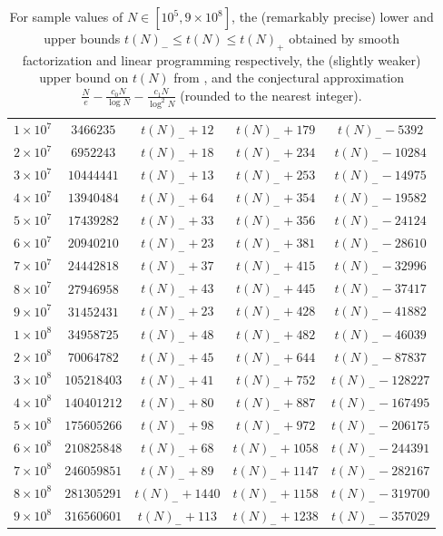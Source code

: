\documentclass[12pt,a4paper,reqno]{amsart}
\numberwithin{equation}{section}
\theoremstyle{plain}
\theoremstyle{definition}
\begin{document}
\begin{table}[ht]
\begin{tabular}{|c|c|c|c|c|}
\hline
$1 \times 10^7$ & $\num{3466235}$ & $t(N)_- + 12$ & $t(N)_- + 179$ & $t(N)_- - \num{5392}$ \\
$2 \times 10^7$ & $\num{6952243}$ & $t(N)_- + 18$ & $t(N)_- + 234$ & $t(N)_- - \num{10284}$ \\
$3 \times 10^7$ & $\num{10444441}$ & $t(N)_- + 13$ & $t(N)_- + 253$ & $t(N)_- - \num{14975}$ \\
$4 \times 10^7$ & $\num{13940484}$ & $t(N)_- + 64$ & $t(N)_- + 354$ & $t(N)_- - \num{19582}$ \\
$5 \times 10^7$ & $\num{17439282}$ & $t(N)_- + 33$ & $t(N)_- + 356$ & $t(N)_- - \num{24124}$ \\
$6 \times 10^7$ & $\num{20940210}$ & $t(N)_- + 23$ & $t(N)_- + 381$ & $t(N)_- - \num{28610}$ \\
$7 \times 10^7$ & $\num{24442818}$ & $t(N)_- + 37$ & $t(N)_- + 415$ & $t(N)_- - \num{32996}$ \\
$8 \times 10^7$ & $\num{27946958}$ & $t(N)_- + 43$ & $t(N)_- + 445$ & $t(N)_- - \num{37417}$ \\
$9 \times 10^7$ & $\num{31452431}$ & $t(N)_- + 23$ & $t(N)_- + 428$ & $t(N)_- - \num{41882}$ \\
\hline
$1 \times 10^8$ & $\num{34958725}$ & $t(N)_- + 48$ & $t(N)_- + 482$ & $t(N)_- - \num{46039}$ \\
$2 \times 10^8$ & $\num{70064782}$ & $t(N)_- + 45$ & $t(N)_- + 644$ & $t(N)_- - \num{87837}$ \\
$3 \times 10^8$ & $\num{105218403}$ & $t(N)_- + 41$ & $t(N)_- + 752$ & $t(N)_- - \num{128227}$ \\
$4 \times 10^8$ & $\num{140401212}$ & $t(N)_- + 80$ & $t(N)_- + 887$ & $t(N)_- - \num{167495}$ \\
$5 \times 10^8$ & $\num{175605266}$ & $t(N)_- + 98$ & $t(N)_- + 972$ & $t(N)_- - \num{206175}$ \\
$6 \times 10^8$ & $\num{210825848}$ & $t(N)_- + 68$ & $t(N)_- + 1058$ & $t(N)_- - \num{244391}$ \\
$7 \times 10^8$ & $\num{246059851}$ & $t(N)_- + 89$ & $t(N)_- + 1147$ & $t(N)_- - \num{282167}$ \\
$8 \times 10^8$ & $\num{281305291}$ & $t(N)_- + 1440$ & $t(N)_- + 1158$ & $t(N)_- - \num{319700}$ \\
$9 \times 10^8$ & $\num{316560601}$ & $t(N)_- + 113$ & $t(N)_- + 1238$ & $t(N)_- - \num{357029}$ \\
      \hline
\end{tabular}
\caption{For sample values of $N \in [10^5, 9 \times 10^8]$, the (remarkably precise) lower and upper bounds $t(N)_- \leq t(N) \leq t(N)_+$ obtained by smooth factorization and linear programming respectively, the (slightly weaker) upper bound on $t(N)$ from , and the conjectural approximation $\frac{N}{e} - \frac{c_0 N}{\log N} - \frac{c_1N}{\log^2 N}$ (rounded to the nearest integer). }\label{long-table}
\end{table}
\end{document}
